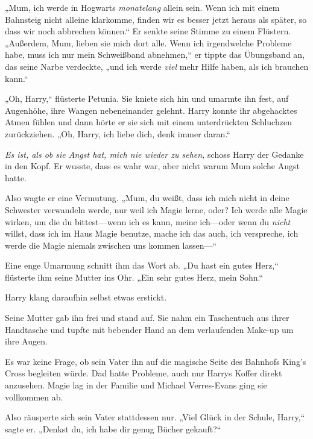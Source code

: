 {„Mum, ich werde in Hogwarts \emph{monatelang} allein sein. Wenn ich mit einem Bahnsteig nicht alleine klarkomme, finden wir es besser jetzt heraus als später, so dass wir noch abbrechen können.“ Er senkte seine Stimme zu einem Flüstern. „Außerdem, Mum, lieben sie mich dort alle. Wenn ich irgendwelche Probleme habe, muss ich nur mein Schweißband abnehmen,“ er tippte das Übungsband an, das seine Narbe verdeckte, „und ich werde \emph{viel} mehr Hilfe haben, als ich brauchen kann.“

„Oh, Harry,“ flüsterte Petunia. Sie kniete sich hin und umarmte ihn fest, auf Augenhöhe, ihre Wangen nebeneinander gelehnt. Harry konnte ihr abgehacktes Atmen fühlen und dann hörte er sie sich mit einem unterdrückten Schluchzen zurückziehen. „Oh, Harry, ich liebe dich, denk immer daran.“

\emph{Es ist, als ob sie Angst hat, mich nie wieder zu sehen,} schoss Harry der Gedanke in den Kopf. Er wusste, dass es wahr war, aber nicht warum Mum solche Angst hatte.

Also wagte er eine Vermutung. „Mum, du weißt, dass ich mich nicht in deine Schwester verwandeln werde, nur weil ich Magie lerne, oder? Ich werde alle Magie wirken, um die du bittest—wenn ich es kann, meine ich—oder wenn du \emph{nicht} willst, dass ich im Haus Magie benutze, mache ich das auch, ich verspreche, ich werde die Magie niemals zwischen uns kommen lassen—“

Eine enge Umarmung schnitt ihm das Wort ab. „Du hast ein gutes Herz,“ flüsterte ihm seine Mutter ins Ohr. „Ein sehr gutes Herz, mein Sohn.“

Harry klang daraufhin selbst etwas erstickt.

Seine Mutter gab ihn frei und stand auf. Sie nahm ein Taschentuch aus ihrer Handtasche und tupfte mit bebender Hand an dem verlaufenden Make-up um ihre Augen.

Es war keine Frage, ob sein Vater ihn auf die magische Seite des Bahnhofs King's Cross begleiten würde. Dad hatte Probleme, auch nur Harrys Koffer direkt anzusehen. Magie lag in der Familie und Michael Verres-Evans ging sie vollkommen ab.

Also räusperte sich sein Vater stattdessen nur. „Viel Glück in der Schule, Harry,“ sagte er. „Denkst du, ich habe dir genug Bücher gekauft?“

}
